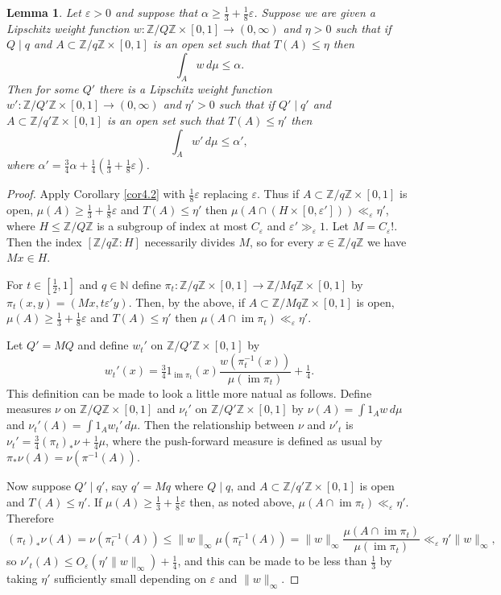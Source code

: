 \documentclass[10pt,reqno]{amsart}
\newtheorem{lemma}[theorem]{Lemma}
\theoremstyle{definition}
\theoremstyle{remark}
\renewcommand{\leq}{\leqslant}
\renewcommand{\geq}{\geqslant}
\newcommand\im{\operatorname{im}}
\def\Z{\mathbb{Z}}
\def\N{\mathbb{N}}
\def\eps{\varepsilon}
\numberwithin{equation}{section}
\begin{document}
\begin{lemma}\label{weight-lem} Let $\eps>0$ and suppose that $\alpha\geq\frac{1}{3} + \frac{1}{8}\eps$. Suppose we are given a Lipschitz weight function $w:\Z/Q\Z\times[0,1]\to(0,\infty)$ and $\eta>0$ such that if $Q\mid q$ and $A\subset \Z/q\Z\times[0,1]$ is an open set such that $T(A)\leq\eta$ then \[\int_A w\,d\mu\leq\alpha.\] Then for some $Q'$ there is a Lipschitz weight function $w':\Z/Q'\Z\times[0,1]\to(0,\infty)$ and $\eta'>0$ such that if $Q'\mid q'$ and $A\subset\Z/q'\Z\times[0,1]$ is an open set such that $T(A)\leq\eta'$ then \[\int_A w'\,d\mu\leq\alpha',\] where $\alpha'=\tfrac{3}{4}\alpha + \tfrac{1}{4}\left(\tfrac{1}{3} + \tfrac{1}{8}\eps\right)$.
\end{lemma}
\begin{proof}
Apply Corollary \ref{cor4.2} with $\frac{1}{8}\eps$ replacing $\eps$. Thus if $A \subset \Z/q\Z \times [0,1]$ is open, $\mu(A) \geq \frac{1}{3} + \frac{1}{8}\eps$ and $T(A) \leq \eta'$ then $\mu(A \cap (H \times [0,\eps'])) \ll_{\eps} \eta'$, where $H \leq \Z/Q\Z$ is a subgroup of index at most $C_{\eps}$ and $\eps'\gg_\eps 1$. Let $M = C_{\eps}!$. Then the index $[\Z/q\Z : H]$ necessarily divides $M$, so for every $x \in \Z/q\Z$ we have $Mx \in H$.

For $t \in \left[\frac{1}{2},1\right]$ and $q\in\N$ define $\pi_t : \Z/q\Z \times [0,1] \rightarrow \Z/Mq\Z \times [0,1]$ by $\pi_t(x,y) = (Mx, t\eps' y)$. Then, by the above, if $A \subset \Z/Mq\Z \times [0,1]$ is open, $\mu(A) \geq \frac{1}{3} + \frac{1}{8}\eps$ and $T(A) \leq \eta'$ then $\mu(A \cap \im\pi_t)\ll_{\eps} \eta'$.

Let $Q' = MQ$ and define $w_t'$ on $\Z/Q'\Z\times[0,1]$ by
\begin{equation}\label{legendary-wt}
  w_t'(x) = \tfrac{3}{4} 1_{\im\pi_t}(x) \frac{w(\pi_t^{-1}(x))}{\mu(\im\pi_t)} + \tfrac{1}{4}.
\end{equation}
This definition can be made to look a little more natual as follows. Define measures $\nu$ on $\Z/Q\Z\times[0,1]$ and $\nu_t'$ on $\Z/Q'\Z \times [0,1]$ by $\nu(A) = \int 1_A w\,d\mu$ and $\nu_t'(A) = \int 1_A w_t'\,d\mu$. Then the relationship between $\nu$ and $\nu'_t$ is $\nu_t' = \frac{3}{4} (\pi_t)_* \nu + \frac{1}{4} \mu$, where the push-forward measure is defined as usual by $\pi_* \nu(A) = \nu(\pi^{-1} (A))$.

Now suppose $Q'\mid q'$, say $q' = Mq$ where $Q\mid q$, and $A\subset\Z/q'\Z\times[0,1]$ is open and $T(A)\leq\eta'$. If $\mu(A)\geq\frac{1}{3}+\frac{1}{8}\eps$ then, as noted above, $\mu(A \cap \im \pi_t) \ll_{\eps} \eta'$. Therefore \[ (\pi_t)_* \nu(A) = \nu(\pi_t^{-1}(A))  \leq \|w\|_{\infty} \mu(\pi_t^{-1}(A))  = \|w\|_\infty \frac{\mu(A \cap \im \pi_t)}{\mu(\im \pi_t)} \ll_{\eps} \eta' \| w \|_{\infty},\] so $\nu'_t(A) \leq O_{\eps}(\eta' \|w\|_\infty) + \frac{1}{4}$, and this can be made to be less than $\frac{1}{3}$ by taking $\eta'$ sufficiently small depending on $\eps$ and $\|w\|_\infty$.


\end{proof}
\end{document}

